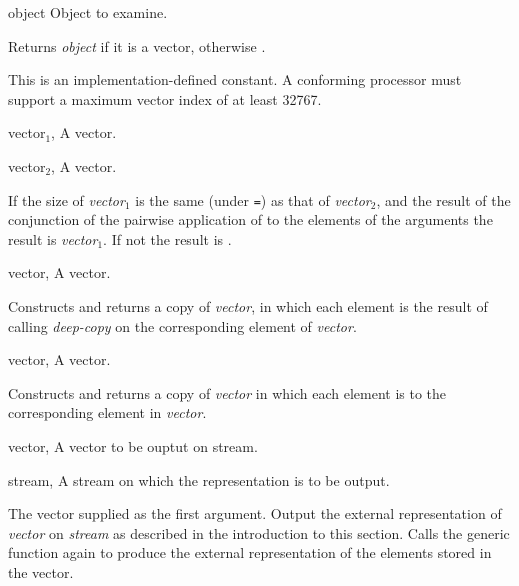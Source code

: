 \begin{optDefinition}
%
\begin{arguments}
    \item[object] Object to examine.
\end{arguments}
%
\result%
Returns {\em object\/} if it is a vector, otherwise \nil{}.

%
\remarks%
This is an implementation-defined constant.  A conforming processor must support
a maximum vector index of at least
32767.

%
\begin{specargs}
    \item[vector$_1$, \classref{vector}] A vector.
    \item[vector$_2$, \classref{vector}] A vector.
\end{specargs}
%
\result%
If the size of {\em vector$_1$} is the same (under {\tt =}) as that of {\em
    vector$_2$}, and the result of the conjunction of the pairwise application
of  to the elements of the arguments \true{} the result is
{\em vector$_1$}.  If not the result is \nil{}.

%
\begin{specargs}
    \item[vector, \classref{vector}] A vector.
\end{specargs}
%
\result%
Constructs and returns a copy of {\em vector}, in which each element is the
result of calling {\em deep-copy\/} on the corresponding element of {\em
    vector}.

%
\begin{specargs}
    \item[vector, \classref{vector}] A vector.
\end{specargs}
%
\result%
Constructs and returns a copy of {\em vector\/} in which each element is
 to the corresponding element in {\em vector}.

%
\begin{specargs}
    \item[vector, \classref{vector}]
    A vector to be ouptut on stream.
    \item[stream, \classref{stream}]
    A stream on which the representation is to be output.
\end{specargs}
%
\result%
The vector supplied as the first argument.
%
\remarks%
Output the external representation of {\em vector\/} on {\em stream\/} as
described in the introduction to this section.  Calls the generic function again
to produce the external representation of the elements stored in the vector.


\end{optDefinition}
